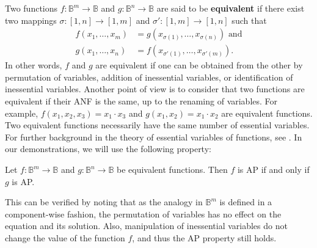 Two functions $f\colon \mathbb{B}^m\to \mathbb{B}$ and $g\colon \mathbb{B}^n\to
\mathbb{B}$ are said to be {\bf equivalent} if there exist two mappings
$\sigma\colon
[1,n]\to [1,m]$ and $\sigma'\colon [1,m]\to [1,n]$ such that
\begin{align*}
  f(x_1,\ldots , x_m)&=g(x_{\sigma(1)},\ldots,x_{\sigma(n)}) \text{ and} \\
   g(x_1,\ldots , x_n)&=f(x_{\sigma'(1)},\ldots,x_{\sigma'(m)}).
\end{align*}
In other words, $f$ and $g$ are equivalent if one can be obtained from the
other by permutation of variables, addition of inessential variables, or
identification of inessential variables. Another point of view is to consider
that two functions are equivalent if their ANF is the same, up to the
renaming of variables. For example, $f(x_1, x_2, x_3) = x_1
\cdot x_3$ and $g(x_1, x_2)  = x_1 \cdot x_2$ are equivalent functions.  Two
equivalent functions necessarily have the same number of essential
variables. For further background in the theory of essential variables of
functions, see \cite{CouceiroTCS08, CouceiroDM09, SalomaaAASF63, WillardDM96}.
In our demonstrations, we will use the following property:

\begin{property}\label{equivalent_functions}
Let $f\colon \mathbb{B}^m\to \mathbb{B}$ and $g\colon \mathbb{B}^n\to
  \mathbb{B}$ be equivalent functions. Then $f$ is AP if and only if $g$ is AP.
\end{property}

This can be verified by noting that as the analogy in $\mathbb{B}^m$ is defined
in a component-wise fashion, the permutation of variables has no effect on the equation and
its solution. Also, manipulation of inessential variables do not change the
value of the function $f$, and thus the AP property still holds.

